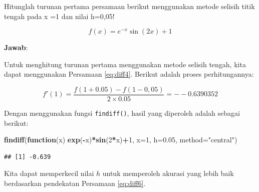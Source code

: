 \documentclass[]{book}
\newenvironment{Shaded}{\begin{snugshade}}{\end{snugshade}}
\newcommand{\ControlFlowTok}[1]{\textcolor[rgb]{0.13,0.29,0.53}{\textbf{#1}}}
\newcommand{\DataTypeTok}[1]{\textcolor[rgb]{0.13,0.29,0.53}{#1}}
\newcommand{\DecValTok}[1]{\textcolor[rgb]{0.00,0.00,0.81}{#1}}
\newcommand{\FloatTok}[1]{\textcolor[rgb]{0.00,0.00,0.81}{#1}}
\newcommand{\KeywordTok}[1]{\textcolor[rgb]{0.13,0.29,0.53}{\textbf{#1}}}
\newcommand{\NormalTok}[1]{#1}
\newcommand{\OperatorTok}[1]{\textcolor[rgb]{0.81,0.36,0.00}{\textbf{#1}}}
\newcommand{\StringTok}[1]{\textcolor[rgb]{0.31,0.60,0.02}{#1}}
\theoremstyle{definition}
\theoremstyle{definition}
\theoremstyle{definition}
\theoremstyle{remark}
\let\BeginKnitrBlock\begin \let\EndKnitrBlock\end
\begin{document}
\BeginKnitrBlock{example}
\protect\hypertarget{exm:diffexm}{}{\label{exm:diffexm} }Hitunglah turunan pertama persamaan berikut menggunakan metode selisih titik tengah pada x =1 dan nilai h=0,05!
\EndKnitrBlock{example}

\[
f\left(x\right)=e^{-x}\sin\left(2x\right)+1
\]

\textbf{Jawab}:

Untuk menghitung turunan pertama menggunakan metode selisih tengah, kita dapat menggunakan Persamaan \eqref{eq:diff4}. Berikut adalah proses perhitungannya:

\[
f'\left(1\right) = \frac{f\left(1+0.05\right)-f\left(1-0,05\right)}{2\times0.05}=--0.6390352
\]

Dengan menggunakan fungsi \texttt{findiff()}, hasil yang diperoleh adalah sebagai berikut:

\begin{Shaded}
\begin{Highlighting}[]
\KeywordTok{findiff}\NormalTok{(}\ControlFlowTok{function}\NormalTok{(x)}
  \KeywordTok{exp}\NormalTok{(}\OperatorTok{-}\NormalTok{x)}\OperatorTok{*}\KeywordTok{sin}\NormalTok{(}\DecValTok{2}\OperatorTok{*}\NormalTok{x)}\OperatorTok{+}\DecValTok{1}\NormalTok{, }\DataTypeTok{x=}\DecValTok{1}\NormalTok{, }\DataTypeTok{h=}\FloatTok{0.05}\NormalTok{,}
  \DataTypeTok{method=}\StringTok{"central"}\NormalTok{)}
\end{Highlighting}
\end{Shaded}

\begin{verbatim}
## [1] -0.639
\end{verbatim}

Kita dapat memperkecil nilai \(h\) untuk memperoleh akurasi yang lebih baik berdasarkan pendekatan Persamaan \eqref{eq:diff6}.

\begin{Shaded}
\end{Shaded}
\end{document}
